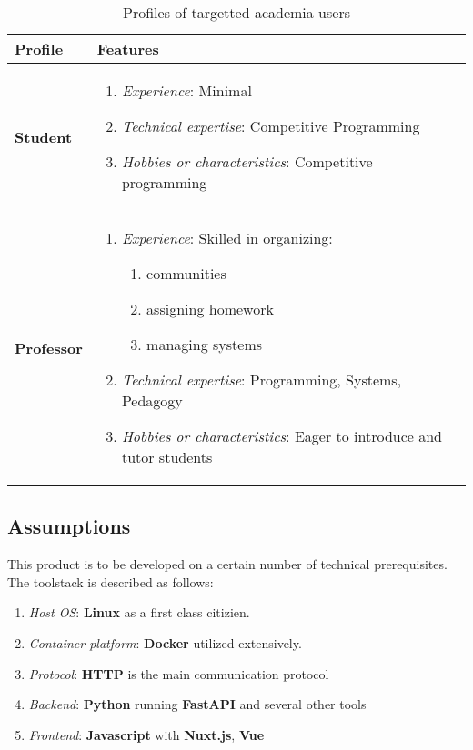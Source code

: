 \begin{table}[h]
    \centering

    \begin{tabular}{ | m{3cm} | m{10cm} | }
        \hline
        Profile & Features \\ \hline

        \textbf{Student} &
        \begin{enumerate}
            \item \textit{Experience}: Minimal
            \item \textit{Technical expertise}: Competitive Programming
            \item \textit{Hobbies or characteristics}: Competitive programming 
        \end{enumerate} \\ \hline

        \textbf{Professor} &
        \begin{enumerate}
            \item \textit{Experience}: Skilled in organizing:
            \begin{enumerate}
                \item communities
                \item assigning homework
                \item managing systems
            \end{enumerate}
            \item \textit{Technical expertise}: Programming, Systems, Pedagogy
            \item \textit{Hobbies or characteristics}: Eager to introduce and tutor students
        \end{enumerate} \\ \hline
    \end{tabular}

    \caption{Profiles of targetted academia users}
\end{table}

\subsection{Assumptions}
This product is to be developed on a certain number of technical prerequisites. The toolstack is described as follows:

\begin{enumerate}
    \item \textit{Host OS}: \textbf{Linux} as a first class citizien.
    \item \textit{Container platform}: \textbf{Docker} utilized extensively.
    \item \textit{Protocol}: \textbf{HTTP} is the main communication protocol
    \item \textit{Backend}: \textbf{Python} running \textbf{FastAPI} and several other tools
    \item \textit{Frontend}: \textbf{Javascript} with \textbf{Nuxt.js}, \textbf{Vue}
\end{enumerate}

